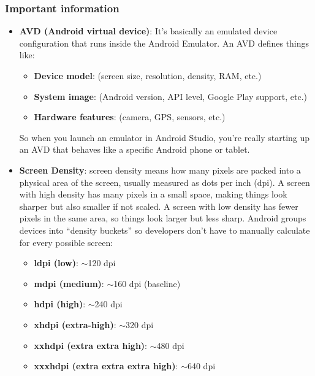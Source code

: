 \documentclass{report}
\begin{document}
    \subsubsection{Important information}
    \begin{itemize}
        \item \textbf{AVD (Android virtual device)}: It’s basically an emulated device configuration that runs inside the Android Emulator. An AVD defines things like:
            \begin{itemize}
                \item \textbf{Device model}: (screen size, resolution, density, RAM, etc.)
                \item \textbf{System image}: (Android version, API level, Google Play support, etc.)
                \item \textbf{Hardware features}: (camera, GPS, sensors, etc.)
            \end{itemize}
            So when you launch an emulator in Android Studio, you’re really starting up an AVD that behaves like a specific Android phone or tablet.
        \item \textbf{Screen Density}: screen density means how many pixels are packed into a physical area of the screen, usually measured as dots per inch (dpi).
            \bigbreak \noindent 
            A screen with high density has many pixels in a small space, making things look sharper but also smaller if not scaled.
            \bigbreak \noindent 
            A screen with low density has fewer pixels in the same area, so things look larger but less sharp.
            \bigbreak \noindent 
            Android groups devices into “density buckets” so developers don’t have to manually calculate for every possible screen:
            \bigbreak \noindent 
            \begin{itemize}
                \item \textbf{ldpi (low)}: $\sim$120 dpi
                \item \textbf{mdpi (medium)}: $\sim$160 dpi (baseline)
                \item \textbf{hdpi (high)}: $\sim$240 dpi
                \item \textbf{xhdpi (extra-high)}: $\sim$320 dpi
                \item \textbf{xxhdpi (extra extra high)}: $\sim$480 dpi
                \item \textbf{xxxhdpi (extra extra extra high)}: $\sim$640 dpi
            \end{itemize}

\end{itemize}
\end{document}
